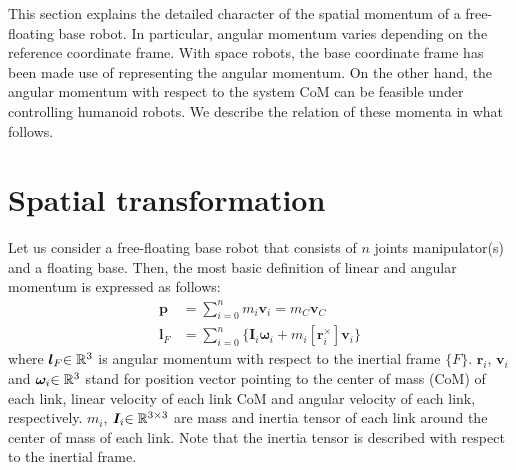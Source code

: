 This section explains the detailed character of the spatial momentum of a free-floating base robot.
In particular, angular momentum varies depending on the reference coordinate frame.
With space robots, the base coordinate frame has been made use of representing the angular momentum.
On the other hand, the angular momentum with respect to the system CoM can be feasible
under controlling humanoid robots.
We describe the relation of these momenta in what follows.

\section{Spatial transformation}
Let us consider a free-floating base robot that consists of $n$ joints manipulator(s)
and a floating base.
Then, the most basic definition of linear and angular momentum is expressed as follows:
% 
\begin{align}
  \bm{p} &= \sum_{i=0}^{n}m_{i}\bm{v}_{i} = m_{C}\bm{v}_{C}\label{eq:APP_LINEAR_MOM}\\
  \bm{l}_{F} &= \sum_{i=0}^{n}\Big\{\bm{I}_{i}\bm{\omega}_{i} + m_{i}[\bm{r}_{i}^{\times}]\bm{v}_{i}\Big\}\label{eq:APP_ANG_MOM_F}
\end{align} 
%
where $\bm{l}_{F}{\in\mathbb{R}^{3}}$ is angular momentum with respect to the inertial frame $\{F\}$.
$\bm{r}_{i}$, $\bm{v}_{i}$ and $\bm{\omega}_{i}{\in\mathbb{R}^{3}}$ stand for
position vector pointing to the center of mass (CoM) of each link,
linear velocity of each link CoM and
angular velocity of each link, respectively.
$m_{i}$, $\bm{I}_{i}{\in\mathbb{R}^{3 \times 3}}$ are mass and inertia tensor of each link around
the center of mass of each link.
Note that the inertia tensor is described with respect to the inertial frame.

